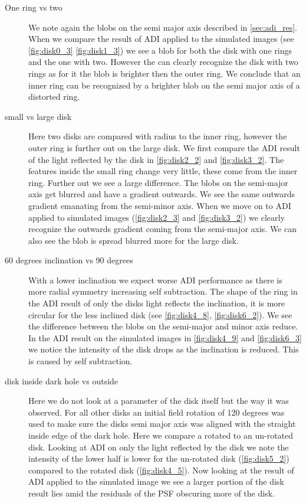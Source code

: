 \begin{description}
\item[One ring vs two]{
We note again the blobs on the semi major axis described in \autoref{sec:adi_res}. When we compare the result of \ac{ADI} applied to the simulated images (see \autoref{fig:disk0_3} \ref{fig:disk1_3}) we see a blob for both the disk with one rings and the one with two. However the can clearly recognize the disk with two rings as for it the blob is brighter then the outer ring. We conclude that an inner ring can be recognized by a brighter blob on the semi major axis of a distorted ring.}
\item[small vs large disk]{
Here two disks are compared with radius to the inner ring, however the outer ring is further out on the large disk. We first compare the \ac{ADI} result of the light reflected by the disk in \autoref{fig:disk2_2} and \autoref{fig:disk3_2}. The features inside the small ring change very little, these come from the inner ring. Further out we see a large difference. The blobs on the semi-major axis get blurred and have a gradient outwards. We see the same outwards gradient emanating from the semi-minor axis. When we move on to \ac{ADI} applied to simulated images (\autoref{fig:disk2_3} and \autoref{fig:disk3_2}) we clearly recognize the outwards gradient coming from the semi-major axis. We can also see the blob is spread blurred more for the large disk.
}
\item[60 degrees inclination vs 90 degrees]{
With a lower inclination we expect worse \ac{ADI} performance as there is more radial symmetry increasing self subtraction. The shape of the ring in the \ac{ADI} result of only the disks light reflects the inclination, it is more circular for the less inclined disk (see \autoref{fig:disk4_8}, \autoref{fig:disk6_2}). We see the difference between the blobs on the semi-major and minor axis reduce. In the \ac{ADI} result on the simulated images in \autoref{fig:disk4_9} and \autoref{fig:disk6_3} we notice the intensity of the disk drops as the inclination is reduced. This is caused by self subtraction. 
}
\item[disk inside dark hole vs outside]{
Here we do not look at a parameter of the disk itself but the way it was observed. For all other disks an initial field rotation of 120 degrees was used to make sure the disks semi major axis was aligned with the straight inside edge of the dark hole. Here we compare a rotated to an un-rotated disk. Looking at \ac{ADI} on only the light reflected by the disk we note the intensity of the lower half is lower for the un-rotated disk (\autoref{fig:disk5_2}) compared to the rotated disk (\autoref{fig:disk4_5}). Now looking at the result of \ac{ADI} applied to the simulated image we see a larger portion of the disk result lies amid the residuals of the \ac{PSF} obscuring more of the disk.
}
\end{description}

